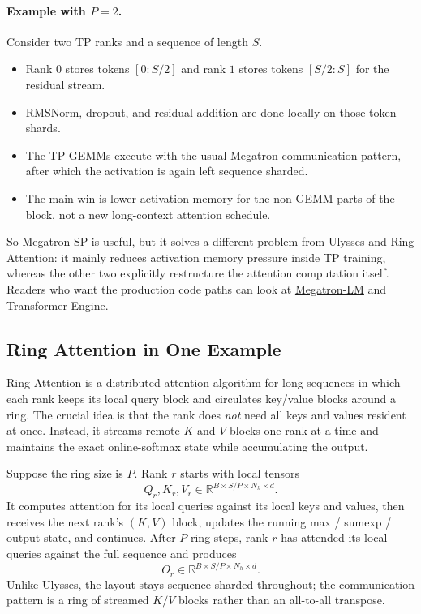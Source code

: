 \documentclass[11pt]{article}
\begin{document}
\paragraph{Example with $P=2$.}
Consider two TP ranks and a sequence of length $S$.
\begin{itemize}
    \item Rank $0$ stores tokens $[0 : S/2]$ and rank $1$ stores tokens
    $[S/2 : S]$ for the residual stream.
    \item RMSNorm, dropout, and residual addition are done locally on those
    token shards.
    \item The TP GEMMs execute with the usual Megatron communication pattern,
    after which the activation is again left sequence sharded.
    \item The main win is lower activation memory for the non-GEMM parts of the
    block, not a new long-context attention schedule.
\end{itemize}

So Megatron-SP is useful, but it solves a different problem from Ulysses and
Ring Attention: it mainly reduces activation memory pressure inside TP training,
whereas the other two explicitly restructure the attention computation itself.
Readers who want the production code paths can look at
\href{https://github.com/NVIDIA/Megatron-LM}{Megatron-LM} and
\href{https://github.com/NVIDIA/TransformerEngine}{Transformer Engine}.

\subsection{Ring Attention in One Example}

Ring Attention is a distributed attention algorithm for long sequences in which
each rank keeps its local query block and circulates key/value blocks around a
ring. The crucial idea is that the rank does \emph{not} need all keys and values
resident at once. Instead, it streams remote $K$ and $V$ blocks one rank at a
time and maintains the exact online-softmax state while accumulating the output.

Suppose the ring size is $P$. Rank $r$ starts with local tensors
\[
Q_r, K_r, V_r \in \mathbb{R}^{B \times S/P \times N_h \times d}.
\]
It computes attention for its local queries against its local keys and values,
then receives the next rank's $(K, V)$ block, updates the running max / sumexp /
output state, and continues. After $P$ ring steps, rank $r$ has attended its
local queries against the full sequence and produces
\[
O_r \in \mathbb{R}^{B \times S/P \times N_h \times d}.
\]
Unlike Ulysses, the layout stays sequence sharded throughout; the communication
pattern is a ring of streamed $K/V$ blocks rather than an all-to-all transpose.
\end{document}
